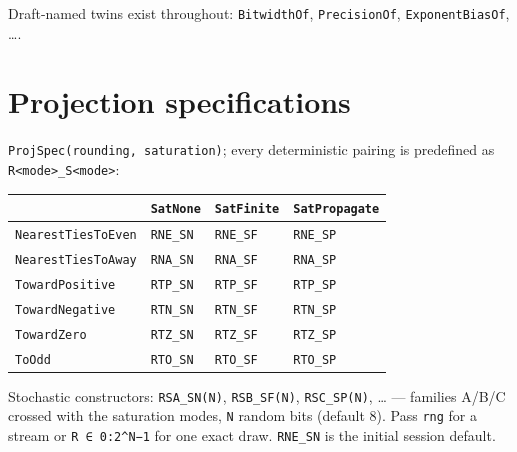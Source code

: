 Draft-named twins exist throughout: \texttt{BitwidthOf}, \texttt{PrecisionOf}, \texttt{ExponentBiasOf}, ….



\section{Projection specifications}



\label{714366806163910976}{}


\texttt{ProjSpec(\allowbreak{}rounding, saturation)}; every deterministic pairing is predefined as \texttt{R<mode>\_\allowbreak{}S<mode>}:




\begin{table}[h]
\centering
\begin{tabulary}{\linewidth}{L L L L}
\toprule
 & \texttt{SatNone} & \texttt{SatFinite} & \texttt{SatPropagate} \\
\toprule
\texttt{NearestTiesToEven} & \texttt{RNE\_\allowbreak{}SN} & \texttt{RNE\_\allowbreak{}SF} & \texttt{RNE\_\allowbreak{}SP} \\
\texttt{NearestTiesToAway} & \texttt{RNA\_\allowbreak{}SN} & \texttt{RNA\_\allowbreak{}SF} & \texttt{RNA\_\allowbreak{}SP} \\
\texttt{TowardPositive} & \texttt{RTP\_\allowbreak{}SN} & \texttt{RTP\_\allowbreak{}SF} & \texttt{RTP\_\allowbreak{}SP} \\
\texttt{TowardNegative} & \texttt{RTN\_\allowbreak{}SN} & \texttt{RTN\_\allowbreak{}SF} & \texttt{RTN\_\allowbreak{}SP} \\
\texttt{TowardZero} & \texttt{RTZ\_\allowbreak{}SN} & \texttt{RTZ\_\allowbreak{}SF} & \texttt{RTZ\_\allowbreak{}SP} \\
\texttt{ToOdd} & \texttt{RTO\_\allowbreak{}SN} & \texttt{RTO\_\allowbreak{}SF} & \texttt{RTO\_\allowbreak{}SP} \\
\bottomrule
\end{tabulary}

\end{table}



Stochastic constructors: \texttt{RSA\_\allowbreak{}SN(N)}, \texttt{RSB\_\allowbreak{}SF(N)}, \texttt{RSC\_\allowbreak{}SP(N)}, … — families A/B/C crossed with the saturation modes, \texttt{N} random bits (default 8). Pass \texttt{rng} for a stream or \texttt{R ∈ 0:2{\textasciicircum}N−1} for one exact draw. \texttt{RNE\_\allowbreak{}SN} is the initial session default.



